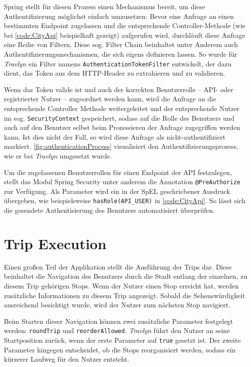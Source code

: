 		Spring stellt für diesen Prozess einen Mechanismus bereit, um diese Authentifizierung möglichst einfach umzusetzen: Bevor eine Anfrage an einen bestimmten Endpoint zugelassen und die entsprechende Controller-Methode (wie bei \autoref{code:CityApi} beispielhaft gezeigt) aufgerufen wird, durchläuft diese Anfrage eine Reihe von Filtern. Diese sog. Filter Chain beinhaltet unter Anderem auch Authentifizierungsmechanismen, die sich eigens definieren lassen. So wurde für \textit{Travlyn} ein Filter namens \lstinline|AuthenticationTokenFilter| entwickelt, der dazu dient, das Token aus dem \acs{HTTP}-Header zu extrahieren und zu validieren. 
		
		Wenn das Token valide ist und auch der korrekten Benutzerrolle -- \acs{API}- oder registrierter Nutzer -- zugeordnet werden kann, wird die Anfrage an die entsprechende Controller Methode weitergeleitet und der entsprechende Nutzer im sog. \lstinline|SecurityContext| gespeichert, sodass auf die Rolle des Benutzers und auch auf den Benutzer selbst beim Prozessieren der Anfrage zugegriffen werden kann. Ist dies nicht der Fall, so wird diese Anfrage als nicht-authentifiziert markiert. \autoref{fig:authenticationProcess} visualisiert den Authentifizierungsprozess, wie er bei \textit{Travlyn} umgesetzt wurde.
		
		Um die zugelassenen Benutzerrollen für einen Endpoint der \acs{API} festzulegen, stellt das Modul Spring Security unter anderem die Annotation \lstinline|@PreAuthorize| zur Verfügung. Als Parameter wird ein in der \ac{SpEL} geschriebener Ausdruck übergeben, wie beispielsweise \lstinline|hasRole(API_USER)| in \autoref{code:CityApi}. So lässt sich die gesendete Authentisierung des Benutzers automatisiert überprüfen.
		
	\section{Trip Execution} 
	
		Einen großen Teil der Applikation stellt die Ausführung der Trips dar. Diese beinhaltet die Navigation des Benutzers durch die Stadt entlang der einzelnen, zu diesem Trip gehörigen Stops. Wenn der Nutzer einen Stop erreicht hat, werden zusätzliche Informationen zu diesem Trip angezeigt. Sobald die Sehenswürdigkeit ausreichend besichtigt wurde, wird der Nutzer zum nächsten Stop navigiert. 
		
		Beim Starten dieser Navigation können zwei zusätzliche Parameter festgelegt werden: \lstinline|roundTrip| und \lstinline|reorderAllowed|. \textit{Travlyn} führt den Nutzer an seine Startposition zurück, wenn der erste Parameter auf \lstinline|true| gesetzt ist. Der zweite Parameter hingegen entscheidet, ob die Stops reorganisiert werden, sodass ein kürzerer Laufweg für den Nutzer entsteht. 
		
